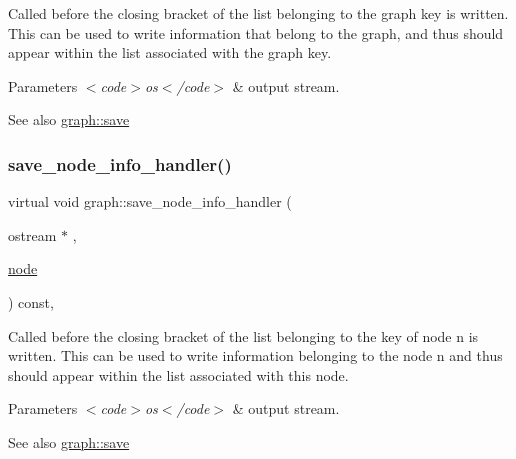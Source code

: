 Called before the closing bracket of the list belonging to the graph key is written. This can be used to write information that belong to the graph, and thus should appear within the list associated with the graph key.


\begin{DoxyParams}{Parameters}
{\em $<$code$>$os$<$/code$>$} & output stream. \\
\hline
\end{DoxyParams}
\begin{DoxySeeAlso}{See also}
\mbox{\hyperlink{classgraph_a7bd0712a528249d1585085a64ac3e661}{graph\+::save}} 
\end{DoxySeeAlso}
\mbox{\label{classgraph_a9c7286899f32db62873b8242e90051d7}} 
\subsubsection{\texorpdfstring{save\+\_\+node\+\_\+info\+\_\+handler()}{save\_node\_info\_handler()}}
{\footnotesize\ttfamily virtual void graph\+::save\+\_\+node\+\_\+info\+\_\+handler (\begin{DoxyParamCaption}\item[{ostream $\ast$}]{,  }\item[{\mbox{\hyperlink{classnode}{node}}}]{ }\end{DoxyParamCaption}) const\hspace{0.3cm}{\ttfamily [inline]}, {\ttfamily [virtual]}}

Called before the closing bracket of the list belonging to the key of node {\ttfamily n} is written. This can be used to write information belonging to the node {\ttfamily n} and thus should appear within the list associated with this node.


\begin{DoxyParams}{Parameters}
{\em $<$code$>$os$<$/code$>$} & output stream. \\
\hline
\end{DoxyParams}
\begin{DoxySeeAlso}{See also}
\mbox{\hyperlink{classgraph_a7bd0712a528249d1585085a64ac3e661}{graph\+::save}} 
\end{DoxySeeAlso}
\mbox{\label{classgraph_aaac6dc28cddaf9fbff20ddb4228dad9a}} 

